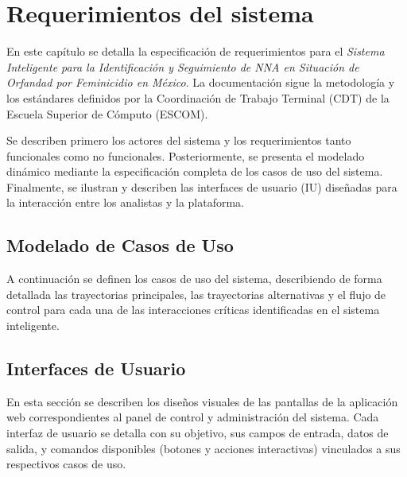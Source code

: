 
\chapter{Requerimientos del sistema}
\label{ch:requerimientos}

En este capítulo se detalla la especificación de requerimientos para el \textit{Sistema Inteligente para la Identificación y Seguimiento de NNA en Situación de Orfandad por Feminicidio en México}. La documentación sigue la metodología y los estándares definidos por la Coordinación de Trabajo Terminal (CDT) de la Escuela Superior de Cómputo (ESCOM).

Se describen primero los actores del sistema y los requerimientos tanto funcionales como no funcionales. Posteriormente, se presenta el modelado dinámico mediante la especificación completa de los casos de uso del sistema. Finalmente, se ilustran y describen las interfaces de usuario (IU) diseñadas para la interacción entre los analistas y la plataforma.







\section{Modelado de Casos de Uso}
A continuación se definen los casos de uso del sistema, describiendo de forma detallada las trayectorias principales, las trayectorias alternativas y el flujo de control para cada una de las interacciones críticas identificadas en el sistema inteligente.









\newpage
\section{Interfaces de Usuario}
En esta sección se describen los diseños visuales de las pantallas de la aplicación web correspondientes al panel de control y administración del sistema. Cada interfaz de usuario se detalla con su objetivo, sus campos de entrada, datos de salida, y comandos disponibles (botones y acciones interactivas) vinculados a sus respectivos casos de uso.






